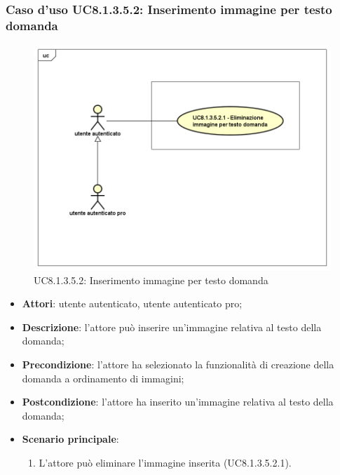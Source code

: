 \subsubsection{Caso d'uso UC8.1.3.5.2: Inserimento immagine per testo domanda}
\label{UC8.1.3.5.2}
\begin{figure}[h]
	\centering
	\includegraphics[scale=0.45,keepaspectratio]{UML/UC8_1_3_5_2.png}
	\caption{UC8.1.3.5.2: Inserimento immagine per testo domanda}
\end{figure}
\FloatBarrier
\begin{itemize}
	\item\textbf{Attori}: utente autenticato, utente autenticato pro;
	\item\textbf{Descrizione}: l'attore può inserire un'immagine relativa al testo della domanda;
	\item\textbf{Precondizione}: l'attore ha selezionato la funzionalità di creazione della domanda a ordinamento di immagini; 
	\item \textbf{Postcondizione}: l'attore ha inserito un'immagine relativa al testo della domanda;
	\item\textbf{Scenario principale}: 
		\begin{enumerate}
			\item L'attore può eliminare l'immagine inserita (UC8.1.3.5.2.1).
		\end{enumerate}
\end{itemize}

